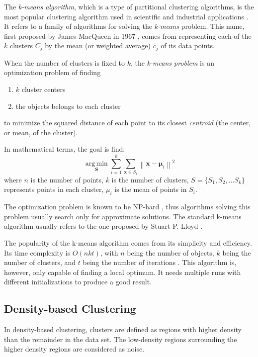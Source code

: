 \documentclass[conference]{IEEEtran}
\begin{document}
The \textit{k-means algorithm}, which is a type of partitional clustering algorithms, is the most popular clustering algorithm used in scientific and industrial applications \cite{wang2006encyclopedia}. It refers to a family of algorithms for solving the \textit{k-means} problem. This name, first proposed by James MacQueen in 1967 \cite{macqueen1967some}, comes from representing each of the $k$ clusters $C_{j}$ by the mean (or weighted average) $c_{j}$ of its data points.

When the number of clusters is fixed to $k$, the \textit{k-means problem} is an optimization problem of finding
\begin{enumerate}
\item $k$ cluster centers
\item the objects belongs to each cluster
\end{enumerate}
to minimize the squared distance of each point to its closest \textit{centroid} (the center, or mean, of the cluster).

In mathematical terms, the goal is find:
$$ \underset{\mathbf{S}}{\operatorname{arg\,min}} \sum_{i=1}^{k} \sum_{\mathbf x \in S_i} \left\| \mathbf x - \boldsymbol\mu_i \right\|^2
$$
where $n$ is the number of points, $k$ is the number of clusters, $S = \{S_1, S_2, ... S_k\}$ represents points in each cluster, $\mu_i$ is the mean of points in $S_i$.

The optimization problem is known to be NP-hard \cite{mahajan2009planar}, thus algorithms solving this problem usually search only for approximate solutions. The standard k-means algorithm usually refers to the one proposed by Stuart P. Lloyd \cite{lloyd1982least}.

The popularity of the k-means algorithm comes from its simplicity and efficiency. Its time complexity is $O(nkt)$, with $n$ being the number of objects, $k$ being the number of clusters, and $t$ being the number of iterations \cite{dong2009k}. This algorithm is, however, only capable of finding a local optimum. It needs multiple runs with different initializations to produce a good result.

\subsection{Density-based Clustering}
In density-based clustering, clusters are defined as regions with higher density than the remainder in the data set. The low-density regions surrounding the higher density regions are considered as noise.
\end{document}
